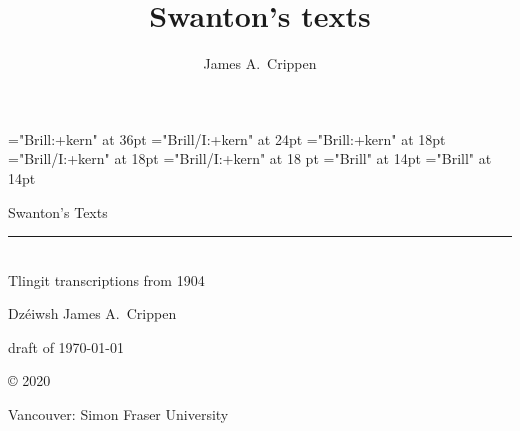 
\thispagestyle{empty}

\title{Swanton’s texts}
\author{James A.\ Crippen}


\font\titlefont="Brill:+kern" at 36pt
\font\subtitlefont="Brill/I:+kern" at 24pt
\font\authorfont="Brill:+kern" at 18pt
\font\authoritalfont="Brill/I:+kern" at 18pt
\font\authorandfont="Brill/I:+kern" at 18 pt
\font\datefont="Brill" at 14pt
\font\copyfont="Brill" at 14pt

\pagestyle{empty}

\vspace*{1em}
\begin{center}
\titlefont
Swanton’s Texts \\[0.125em]
\rule{0.75\textwidth}{0.4pt} \\[0.25em]
\subtitlefont
Tlingit transcriptions from 1904
\end{center}
\normalfont

\begin{center}
\vspace*{3em}
\authoritalfont Dzéiwsh
\authorfont James A.\ Crippen
\end{center}
\normalfont

\begin{center}
\vspace*{18em}
\datefont
draft of \today
\end{center}
\normalfont

\vspace*{1em}
\begin{center}
\copyfont
© 2020 \theauthor
\end{center}

\vspace*{1em}
\begin{center}
Vancouver: Simon Fraser University
\end{center}